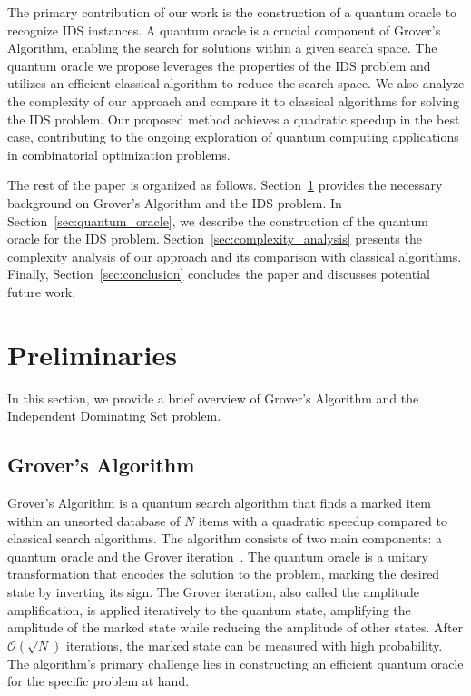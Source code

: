 The primary contribution of our work is the construction of a quantum oracle to recognize IDS instances. A quantum oracle is a crucial component of Grover's Algorithm, enabling the search for solutions within a given search space. The quantum oracle we propose leverages the properties of the IDS problem and utilizes an efficient classical algorithm to reduce the search space. We also analyze the complexity of our approach and compare it to classical algorithms for solving the IDS problem. Our proposed method achieves a quadratic speedup in the best case, contributing to the ongoing exploration of quantum computing applications in combinatorial optimization problems.

The rest of the paper is organized as follows. Section~\ref{sec:preliminaries} provides the necessary background on Grover's Algorithm and the IDS problem. In Section~\ref{sec:quantum_oracle}, we describe the construction of the quantum oracle for the IDS problem. Section~\ref{sec:complexity_analysis} presents the complexity analysis of our approach and its comparison with classical algorithms. Finally, Section~\ref{sec:conclusion} concludes the paper and discusses potential future work.

\section{Preliminaries}
\label{sec:preliminaries}
In this section, we provide a brief overview of Grover's Algorithm and the Independent Dominating Set problem.

\subsection{Grover's Algorithm}
Grover's Algorithm is a quantum search algorithm that finds a marked item within an unsorted database of $N$ items with a quadratic speedup compared to classical search algorithms. The algorithm consists of two main components: a quantum oracle and the Grover iteration~\cite{grover1996fast}. The quantum oracle is a unitary transformation that encodes the solution to the problem, marking the desired state by inverting its sign. The Grover iteration, also called the amplitude amplification, is applied iteratively to the quantum state, amplifying the amplitude of the marked state while reducing the amplitude of other states. After $\mathcal{O}(\sqrt{N})$ iterations, the marked state can be measured with high probability. The algorithm's primary challenge lies in constructing an efficient quantum oracle for the specific problem at hand.


